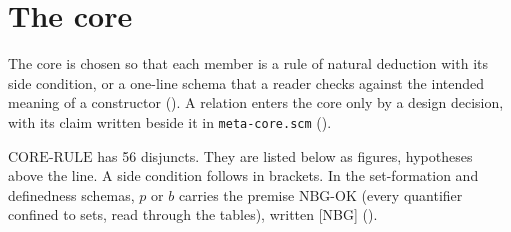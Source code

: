 \section{The core}\label{sec:meta-core}

The core is chosen so that each member is a rule of natural deduction
with its side condition, or a one-line schema that a reader checks
against the intended meaning of a constructor ().  A relation
enters the core only by a design decision, with its claim written beside
it in \texttt{meta-core.scm} ().

$\mathrm{CORE\text{-}RULE}$ has 56 disjuncts.  They are listed below as
figures, hypotheses above the line.  A side condition follows in
brackets.  In the set-formation and definedness schemas, $p$ or $b$
carries the premise $\mathrm{NBG\text{-}OK}$ (every quantifier confined
to sets, read through the tables), written [NBG] ().

